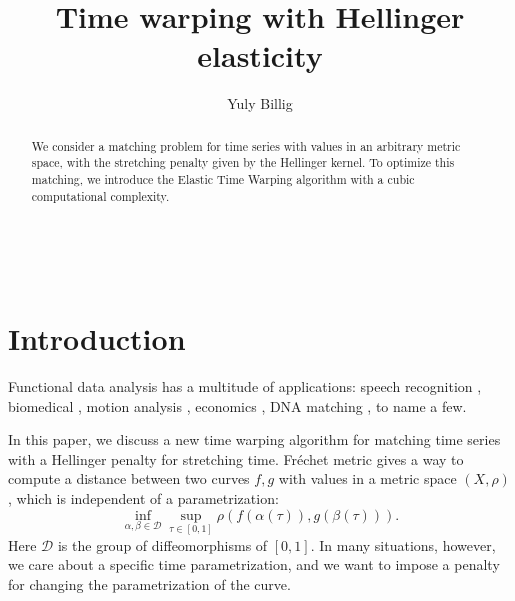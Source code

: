 \documentclass[12pt]{amsart}
\begin{document}
\newtheorem{theorem}{Theorem}
\newtheorem{proposition}[theorem]{Proposition}
\newtheorem{corollary}[theorem]{Corollary}
\newtheorem{lemma}[theorem]{Lemma}
\newtheorem{definition}[theorem]{Definition}
\newtheorem{remark}[theorem]{Remark}
\newtheorem{conjecture}[theorem]{Conjecture}

\newcommand\Diff{\text{Diff}([0,1])}
\newcommand\R{\mathbb R}
\newcommand\D{\mathcal D}
\newcommand\id{\text{id}}

\

\title
[Time warping with Hellinger elasticity]
{Time warping with Hellinger elasticity}
\author{Yuly Billig}
\address{School of Mathematics and Statistics, Carleton University, Ottawa, Canada}

\maketitle


\begin{abstract} We consider a matching problem for time series with values in an arbitrary metric space, with the stretching penalty given by the Hellinger kernel. To optimize this matching, we introduce the Elastic Time Warping algorithm with a cubic computational complexity. 
\end{abstract}

\section{Introduction}

Functional data analysis has a multitude of applications: speech recognition \cite{SC}, biomedical \cite{K}, motion analysis \cite{SJW}, economics \cite{MMQV}, DNA matching \cite{H}, to name a few.

In this paper, we discuss a new time warping algorithm for matching time series with a Hellinger penalty for stretching time. Fr\'echet metric gives a way to compute a distance between two curves $f, g$ with values in a metric space $(X, \rho)$, which is independent of a parametrization: 
\[\inf_{\alpha,\beta\in\D} \sup_{\tau \in [0,1]} \rho(f(\alpha(\tau)), g(\beta(\tau))).\]
Here $\D$ is the group of diffeomorphisms of $[0,1]$. In many situations, however, we care about a specific time parametrization, and we want to impose a penalty for changing the parametrization of the curve.
\end{document}

